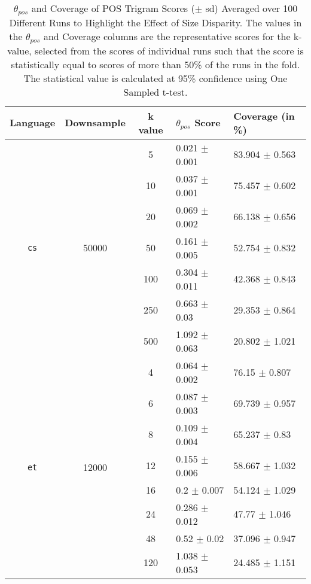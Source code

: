 \begin{table}[H]
    \centering
    \begin{tabular}{|c|c||c|l|l|}
        \hline
        \textbf{Language} & \textbf{Downsample} & \textbf{k value} & \textbf{\(\theta_{pos}\) Score} & \textbf{Coverage (in \%)}\\
        \hline
        \hline
        \multirow{7}{*}{\texttt{cs}} & \multirow{7}{*}{50000} & 5 & 0.021 \(\pm\) 0.001 & 83.904 \(\pm\) 0.563\\
        & & 10 & 0.037 \(\pm\) 0.001 & 75.457 \(\pm\) 0.602\\
        & & 20 & 0.069 \(\pm\) 0.002 & 66.138 \(\pm\) 0.656\\
        & & 50 & 0.161 \(\pm\) 0.005 & 52.754 \(\pm\) 0.832\\
        & & 100 & 0.304 \(\pm\) 0.011 & 42.368 \(\pm\) 0.843\\
        & & 250 & 0.663 \(\pm\) 0.03 & 29.353 \(\pm\) 0.864\\
        & & 500 & 1.092 \(\pm\) 0.063 & 20.802 \(\pm\) 1.021\\
        \hline
        \hline
        \multirow{8}{*}{\texttt{et}} & \multirow{8}{*}{12000} & 4 & 0.064 \(\pm\) 0.002 & 76.15 \(\pm\) 0.807\\
        & & 6 & 0.087 \(\pm\) 0.003 & 69.739 \(\pm\) 0.957\\
        & & 8 & 0.109 \(\pm\) 0.004 & 65.237 \(\pm\) 0.83\\
        & & 12 & 0.155 \(\pm\) 0.006 & 58.667 \(\pm\) 1.032\\
        & & 16 & 0.2 \(\pm\) 0.007 & 54.124 \(\pm\) 1.029\\
        & & 24 & 0.286 \(\pm\) 0.012 & 47.77 \(\pm\) 1.046\\
        & & 48 & 0.52 \(\pm\) 0.02 & 37.096 \(\pm\) 0.947\\
        & & 120 & 1.038 \(\pm\) 0.053 & 24.485 \(\pm\) 1.151\\
        \hline
    \end{tabular}
    \caption[\(\theta_{pos}\) and Coverage of POS Trigram Scores (\(\pm\) sd) Averaged over 100 Different Runs to Highlight the Effect of Size Disparity]{\(\theta_{pos}\) and Coverage of POS Trigram Scores (\(\pm\) sd) Averaged over 100 Different Runs to Highlight the Effect of Size Disparity. The values in the \(\theta_{pos}\) and Coverage columns are the representative scores for the k-value, selected from the scores of individual runs such that the score is statistically equal to scores of more than 50\% of the runs in the fold. The statistical value is calculated at 95\% confidence using One Sampled t-test.}
    \label{tab:pos-harmony-size}
\end{table}

